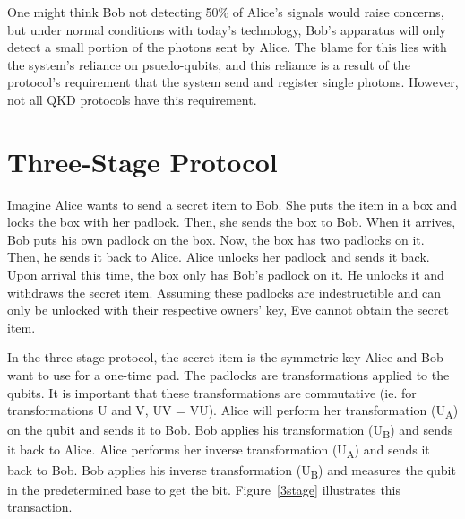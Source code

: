 \documentclass[12pt,twocolumn]{article}
\begin{document}
One might think Bob not detecting 50\% of Alice's signals would raise concerns, but under normal conditions with today's technology, Bob's apparatus will only detect a small portion of the photons sent by Alice. The blame for this lies with the system's reliance on psuedo-qubits, and this reliance is a result of the protocol's requirement that the system send and register single photons. However, not all QKD protocols have this requirement.

\section{Three-Stage Protocol}
Imagine Alice wants to send a secret item to Bob. She puts the item in a box and locks the box with her padlock. Then, she sends the box to Bob. When it arrives, Bob puts his own padlock on the box. Now, the box has two padlocks on it. Then, he sends it back to Alice. Alice unlocks her padlock and sends it back. Upon arrival this time, the box only has Bob's padlock on it. He unlocks it and withdraws the secret item. Assuming these padlocks are indestructible and can only be unlocked with their respective owners' key, Eve cannot obtain the secret item.

In the three-stage protocol\cite{kak:06}, the secret item is the symmetric key Alice and Bob want to use for a one-time pad.
The padlocks are transformations\cite{kak:00} applied to the qubits.
It is important that these transformations are commutative (ie. for transformations U and V, UV = VU).
Alice will perform her transformation (U\textsubscript{A}) on the qubit and sends it to Bob.
Bob applies his transformation (U\textsubscript{B}) and sends it back to Alice.
Alice performs her inverse transformation (U\textsubscript{A}\textsuperscript{}) and sends it back to Bob.
Bob applies his inverse transformation (U\textsubscript{B}\textsuperscript{}) and measures the qubit in the predetermined base to get the bit.
Figure~\ref{3stage} illustrates this transaction.

\end{document}
